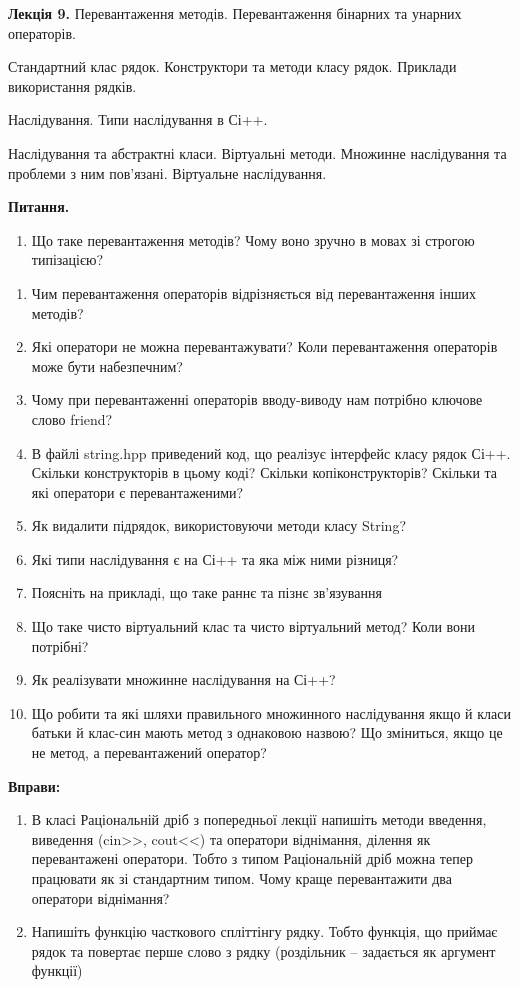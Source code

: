 \documentclass[]{article}
\begin{document}
\textbf{Лекція 9.} Перевантаження методів. Перевантаження бінарних та
унарних операторів.

Стандартний клас рядок. Конструктори та методи класу рядок. Приклади
використання рядків.

Наслідування. Типи наслідування в Сі++.

Наслідування та абстрактні класи. Віртуальні методи. Множинне
наслідування та проблеми з ним пов'язані. Віртуальне наслідування.

\textbf{Питання.}

\begin{enumerate}
\def\labelenumi{\arabic{enumi})}
\item
  \protect\hypertarget{_Hlk57988736}{}{}Що таке перевантаження методів?
  Чому воно зручно в мовах зі строгою типізацією?
\end{enumerate}

\begin{enumerate}
\def\labelenumi{\arabic{enumi})}
\item
  Чим перевантаження операторів відрізняється від перевантаження інших
  методів?
\item
  Які оператори не можна перевантажувати? Коли перевантаження операторів
  може бути набезпечним?
\item
  Чому при перевантаженні операторів вводу-виводу нам потрібно ключове
  слово friend?
\item
  В файлі string.hpp приведений код, що реалізує інтерфейс класу рядок
  Сі++. Скільки конструкторів в цьому коді? Скільки копіконструкторів?
  Скільки та які оператори є перевантаженими?
\item
  Як видалити підрядок, використовуючи методи класу String?
\item
  Які типи наслідування є на Сі++ та яка між ними різниця?
\item
  Поясніть на прикладі, що таке раннє та пізнє зв'язування
\item
  Що таке чисто віртуальний клас та чисто віртуальний метод? Коли вони
  потрібні?
\item
  Як реалізувати множинне наслідування на Сі++?
\item
  Що робити та які шляхи правильного множинного наслідування якщо й
  класи батьки й клас-син мають метод з однаковою назвою? Що зміниться,
  якщо це не метод, а перевантажений оператор?
\end{enumerate}

\textbf{Вправи:}

\begin{enumerate}
\def\labelenumi{\arabic{enumi})}
\item
  В класі Раціональній дріб з попередньої лекції напишіть методи
  введення, виведення (cin\textgreater{}\textgreater{},
  cout\textless{}\textless{}) та оператори віднімання, ділення як
  перевантажені оператори. Тобто з типом Раціональній дріб можна тепер
  працювати як зі стандартним типом. Чому краще перевантажити два
  оператори віднімання?
\item
  Напишіть функцію часткового спліттінгу рядку. Тобто функція, що
  приймає рядок та повертає перше слово з рядку (роздільник -- задається
  як аргумент функції)
\end{enumerate}
\end{document}
